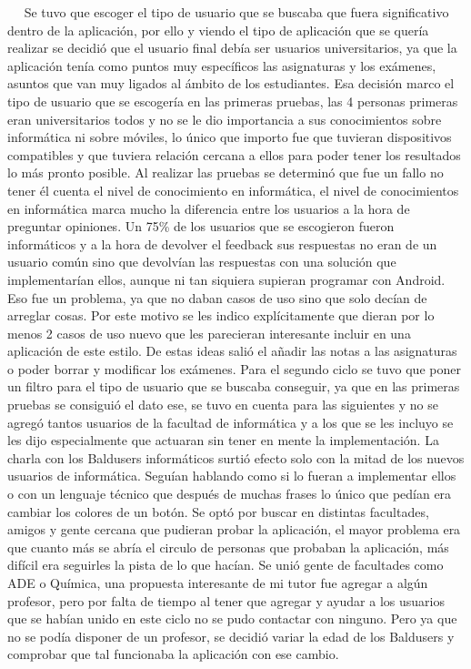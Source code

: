  
Se tuvo que escoger el tipo de usuario que se buscaba que fuera significativo dentro de la aplicación, por ello y viendo el tipo de aplicación que se quería realizar se decidió que el usuario final debía ser usuarios universitarios, ya que la aplicación tenía como puntos muy específicos las asignaturas y los exámenes, asuntos que van muy ligados al ámbito de los estudiantes.
Esa decisión marco el tipo de usuario que se escogería en las primeras pruebas, las 4 personas primeras eran universitarios todos y no se le dio importancia a sus conocimientos sobre informática ni sobre móviles, lo único que importo fue que tuvieran dispositivos compatibles y que tuviera relación cercana a ellos para poder tener los resultados lo más pronto posible.
Al realizar las pruebas se determinó que fue un fallo no tener él cuenta el nivel de conocimiento en informática, el nivel de conocimientos en informática marca mucho la diferencia entre los usuarios a la hora de preguntar opiniones.
Un 75\% de los usuarios que se escogieron fueron informáticos y a la hora de devolver el feedback sus respuestas no eran de un usuario común sino que devolvían las respuestas con una solución que implementarían ellos, aunque ni tan siquiera supieran programar con Android.
Eso fue un problema, ya que no daban casos de uso sino que solo decían de arreglar cosas. Por este motivo se les indico explícitamente  que dieran por lo menos 2 casos de uso nuevo que les parecieran interesante incluir en una aplicación de este estilo.
De estas ideas salió el añadir las notas a las asignaturas o poder borrar y modificar los exámenes.
Para el segundo ciclo se tuvo que poner un filtro para el tipo de usuario que se buscaba conseguir, ya que en las primeras pruebas se consiguió el dato ese, se tuvo en cuenta para las siguientes y no se agregó tantos usuarios de la facultad de informática y a los que se les incluyo se les dijo especialmente que actuaran sin tener en mente la implementación.
La charla con los Baldusers informáticos surtió efecto solo con la mitad de los nuevos usuarios de informática. Seguían hablando como si lo fueran a implementar ellos o con un lenguaje técnico que después de muchas frases lo único que pedían era cambiar los colores de un botón. 
Se optó por buscar en distintas facultades, amigos y gente cercana que pudieran probar la aplicación, el mayor problema era que cuanto más se abría el circulo de personas que probaban la aplicación, más difícil era seguirles la pista de lo que hacían. 
Se unió gente de facultades como ADE o Química, una propuesta interesante de mi tutor fue agregar a algún profesor, pero por falta de tiempo al tener que agregar y ayudar a los usuarios que se habían unido en este ciclo no se pudo contactar con ninguno.
Pero ya que no se podía disponer de un profesor, se decidió variar la edad de los Baldusers y comprobar que tal funcionaba la aplicación con ese cambio.



